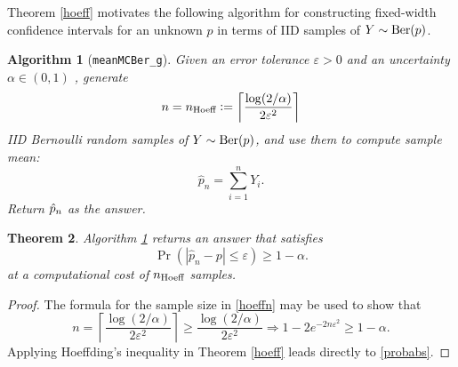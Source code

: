 \documentclass{iitthesis}
\newtheorem{theorem}{Theorem}[section]
\newtheorem{algorithm}[theorem]{Algorithm}
\begin{document}
Theorem \ref{hoeff} motivates the following algorithm for constructing fixed-width confidence intervals for an unknown $p$ in terms of IID samples of $Y\sim \operatorname{Ber}(p)$.
\begin{algorithm}[{\tt meanMCBer\_g}]\label{algabs}
Given an error tolerance $\varepsilon > 0$ and an uncertainty $\alpha \in (0,1)$ , generate
\begin{equation}\label{hoeffn}
n = n_{\text{Hoeff}} := \left \lceil  \frac{\log(2/\alpha)}{2\varepsilon^2} \right \rceil
\end{equation}
IID Bernoulli random samples of $Y \sim \operatorname{Ber}(p)$, and use them to compute sample mean:
\begin{equation} \label{abserrp}
\hat{p}_n = \sum_{i =1}^n Y_i.
\end{equation}
Return $\hat{p}_n$ as the answer.
\end{algorithm}
\begin{theorem}
Algorithm \ref{algabs} returns an answer that satisfies 
\begin{equation}\label{probabs}
\Pr(|\hat{p}_n -p| \leq \varepsilon) \geq 1-\alpha.
\end{equation}
at a computational cost of $n_{\text{Hoeff}}$ samples.
\end{theorem}
\begin{proof}
The formula for the sample size in \eqref{hoeffn} may be used to show that
\begin{equation*}
n = \left \lceil \frac{\log(2/\alpha)}{2\varepsilon^2} \right \rceil \geq  \frac{\log(2/\alpha)}{2\varepsilon^2} \Rightarrow 
1- 2e^{-2n\varepsilon^2} \geq 1-\alpha.
\end{equation*}
Applying  Hoeffding's inequality in Theorem \ref{hoeff} leads directly to \eqref{probabs}. 
\end{proof}
\end{document}
